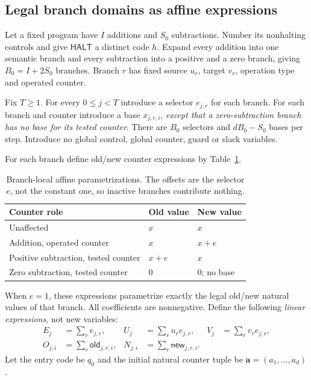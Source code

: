 \documentclass[11pt,letterpaper]{article}
\theoremstyle{definition}
\theoremstyle{remark}
\newcommand{\HALT}{\mathsf{HALT}}
\begin{document}
\subsection{Legal branch domains as affine expressions}
Let a fixed program have $I$ additions and $S_0$ subtractions. Number its nonhalting controls and give $\HALT$ a distinct code $h$. Expand every addition into one semantic branch and every subtraction into a positive and a zero branch, giving $B_0=I+2S_0$ branches. Branch $r$ has fixed source $u_r$, target $v_r$, operation type and operated counter.

Fix $T\geq1$. For every $0\leq j<T$ introduce a selector $e_{j,r}$ for each branch. For each branch and counter introduce a base $x_{j,r,i}$, \emph{except that a zero-subtraction branch has no base for its tested counter}. There are $B_0$ selectors and $dB_0-S_0$ bases per step. Introduce no global control, global counter, guard or slack variables.

For each branch define old/new counter expressions by Table~\ref{qoc:um:tab:bases}.
\begin{table}[ht]
\centering
\begin{tabular}{lll}
\toprule
Counter role & Old value & New value\\\midrule
Unaffected & $x$ & $x$\\
Addition, operated counter & $x$ & $x+e$\\
Positive subtraction, tested counter & $x+e$ & $x$\\
Zero subtraction, tested counter & $0$ & $0$; no base\\\bottomrule
\end{tabular}
\caption{Branch-local affine parametrizations. The offsets are the selector $e$, not the constant one, so inactive branches contribute nothing.}\label{qoc:um:tab:bases}
\end{table}
When $e=1$, these expressions parametrize exactly the legal old/new natural values of that branch. All coefficients are nonnegative. Define the following \emph{linear expressions}, not new variables:
\begin{align*}
 E_j&=\sum_r e_{j,r},&U_j&=\sum_r u_re_{j,r},&V_j&=\sum_r v_re_{j,r},\\
 O_{j,i}&=\sum_r\mathsf{old}_{j,r,i},&
 N_{j,i}&=\sum_r\mathsf{new}_{j,r,i}.&&
\end{align*}
Let the entry code be $q_0$ and the initial natural counter tuple be $\mathbf a=(a_1,\ldots,a_d)$.
\end{document}
